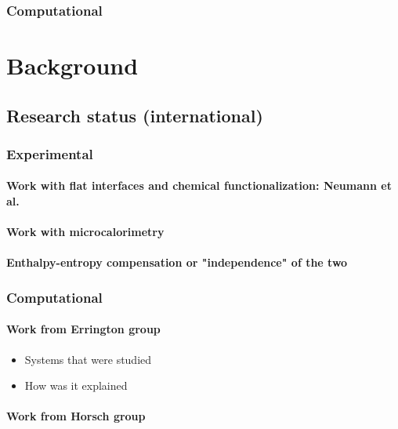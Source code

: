 \documentclass[a4paper,12pt,single,pdftex]{scrartcl}
\begin{document}
\label{ID_734735562}\subsubsection{Computational}

\label{ID_1110611260}\section{Background}

\label{ID_1392626561}\subsection{Research status (international)}

\label{ID_869146050}\subsubsection{Experimental}

\label{ID_121688724}\paragraph{Work with flat interfaces and chemical functionalization: Neumann et al.}

\label{ID_1314084600}\paragraph{Work with microcalorimetry}

\label{ID_30644458}\paragraph{Enthalpy-entropy compensation or "independence" of the two}

\label{ID_1521593594}\subsubsection{Computational}

\label{ID_1690050024}\paragraph{Work from Errington group}

\begin{itemize}
\label{ID_473109498}\item Systems that were studied
\label{ID_1487682070}\item How was it explained
\end{itemize}
\label{ID_473109498}\label{ID_1487682070}\label{ID_980454220}\paragraph{Work from Horsch group}
\end{document}

